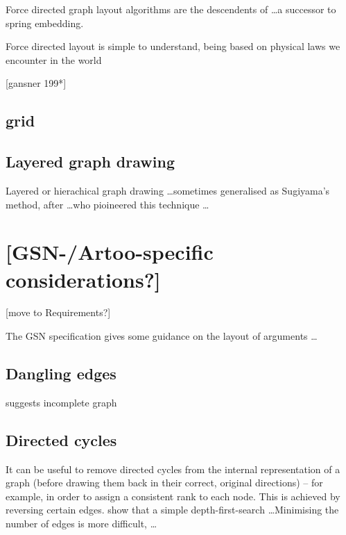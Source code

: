Force directed graph layout algorithms are the descendents of  \citet{tutte} \ldots a successor to \citet{tutte} spring embedding.

Force directed layout is simple to understand, being based on physical laws we encounter in the world 


[gansner 199*]

\subsection{grid}




\subsection{Layered graph drawing}

Layered or hierachical graph drawing  \ldots sometimes generalised as Sugiyama's method, after \ldots who pioineered this technique \ldots 




\section{[GSN-/Artoo-specific considerations?]}

[move to Requirements?]

The GSN specification \citep[section~2.2, pp.~26--27]{gsnstandard} gives some guidance on the layout of arguments \ldots



\subsection{Dangling edges}

suggests incomplete graph

\subsection{Directed cycles}

It can be useful to remove directed cycles from the internal representation of a graph
(before drawing them back in their correct, original directions)
-- for example, in order to assign a consistent rank to each node.
This is achieved by reversing certain edges.
\citet{gansner1993} show that a simple depth-first-search \ldots  Minimising the number of edges is more difficult, \citeauthor{gansner1993} \ldots

